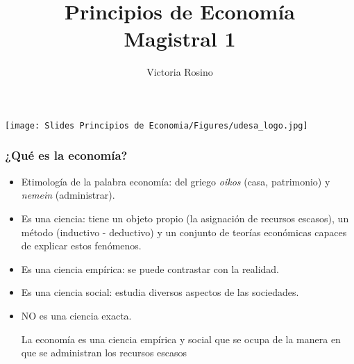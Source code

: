 \documentclass{beamer}
\title[Principios de Economía]{Principios de Economía \vspace{4mm}
\\ Magistral 1}
\date{}
\author[Victoria Rosino]{Victoria Rosino}
\institute[]{Universidad de San Andrés}
\begin{document}
\begin{frame}
    \vspace{0.4cm}
    \titlepage
    \centering
    \vspace{-0.5cm}
    \texttt{[image: Slides Principios de Economia/Figures/udesa\_logo.jpg]} 
\end{frame}



\begin{frame}
\frametitle{¿Qu\'{e} es la economía?}
    \begin{itemize}
        \item Etimología de la palabra economía: del griego \textit{oikos} (casa, patrimonio) y \textit{nemein} (administrar). \vspace{1.5mm}
        \item Es una ciencia: tiene un objeto propio (la asignación de recursos escasos), un método (inductivo - deductivo) y un conjunto de teorías económicas capaces de explicar estos fenómenos. \vspace{1.5mm}
        \item Es una ciencia empírica: se puede contrastar con la realidad. \vspace{1.5mm}
        \item Es una ciencia social: estudia diversos aspectos de las sociedades. \vspace{1.5mm}
        \item NO es una ciencia exacta.
        \begin{center}
        \begin{boxA}
        La economía es una ciencia empírica y social que se ocupa de la manera en que se administran los recursos escasos  
        \end{boxA}
        \end{center}
    \end{itemize}
\end{frame}
\end{document}
